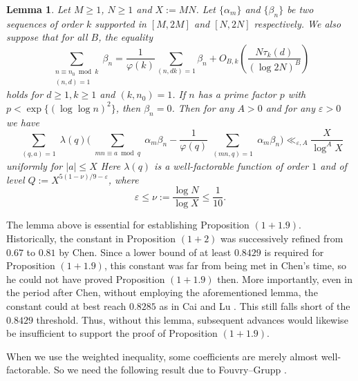 \documentclass[12pt, a4paper]{amsart}
\def\geq{\geqslant}
\def\le{\leqslant}
\theoremstyle{plain}
\newtheorem{lemma}[proposition]{Lemma}
\theoremstyle{remark}
\numberwithin{equation}{section}
\begin{document}
\begin{lemma}\label{Fouvry-new}
Let  $M \geq 1$, $N \geq 1$ and $X := MN$. Let $\{ \alpha_m \}$ and $\{ \beta_n \}$ be two sequences of order $k$ supported in $[M, 2M]$ and $[N, 2N]$ respectively. We also suppose that for all $B$, the equality
\begin{equation}
\sum_{\substack{n \equiv n_0 \bmod{k} \\ (n, d) = 1}} 
\beta_n = \frac{1}{\varphi(k)} \sum_{(n, dk) = 1} \beta_n + O_{B,k} \! \left( \frac{N \tau_k(d)}{(\log 2N)^B} \right)
\end{equation}
holds for $d \geq 1 , k \geq 1$ and $(k, n_0) = 1$. 
If $n$ has a prime factor $p$ with $p < \exp\bigl\{ (\log \log n)^2 \bigr\}$, then $\beta_n = 0$. 
Then for any $A>0$ and for any $\varepsilon>0$ we have
		$$
		\sum_{\substack{(q,a)=1}}\lambda(q)\biggl(\sum_{\substack{mn\equiv a\bmod{q}}}\alpha_{m}\beta_{n}-\frac{1}{\varphi(q)}\sum_{\substack{(mn,q)=1}}\alpha_{m}\beta_{n}\biggr)\ll_{\varepsilon,A}\frac{X}{\log^A X}
		$$
		uniformly for $|a|\le X$ 
Here $\lambda(q)$ is a well-factorable function of order $1$ and of level $Q:=X^{5(1-\nu)/9-\varepsilon}$, where
$$
\varepsilon\le\nu:=\frac{\log N}{\log X} 
\le\frac{1}{10}.
$$ 
\end{lemma} 

The lemma above is essential for establishing Proposition $(1+1.9)$. Historically, the constant in 
Proposition $(1+2)$ was successively refined from $0.67$ to $0.81$ by Chen.  
Since a lower bound of at least $0.8429$ is required for Proposition $(1+1.9)$, 
this constant was far from being met in Chen’s time, so he could not have 
proved Proposition $(1+1.9)$ then. 
More importantly, even in the period after Chen, without employing the aforementioned lemma, 
the constant could at best reach $0.8285$ as in Cai and Lu \cite{CaLu02}.  
This still falls short of the $0.8429$ threshold. Thus, without this lemma, 
subsequent advances 
would likewise be insufficient to support the proof of Proposition $(1+1.9)$. 

\medskip 

When we use the weighted inequality, some coefficients are merely almost well-factorable. So we need the following result due to  
Fouvry--Grupp \cite[Theorem 2]{FG89}.
	
\end{document}
